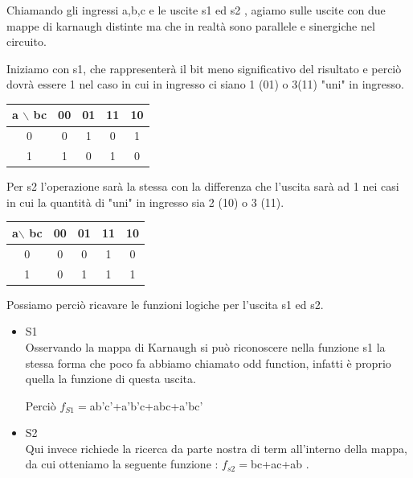 \documentclass[a4paper]{book}
\begin{document}
Chiamando gli ingressi a,b,c e le uscite s1 ed s2 , agiamo sulle uscite con due mappe di karnaugh distinte ma che in realtà sono parallele e sinergiche nel circuito.


Iniziamo con s1, che rappresenterà il bit meno significativo del risultato e perciò dovrà essere 1 nel caso in cui in ingresso ci siano 1 (01) o 3(11) "uni" in ingresso.

\vspace{\baselineskip}
\begin{tabular}{|c|c|c|c|c|}
\hline
a $\backslash$ bc & 00 & 01 & 11 & 10 \\
\hline
0              & 0  & {\cellcolor{yellow} 1 } &  0 & {\cellcolor{yellow}1}  \\
\hline
1             & {\cellcolor{yellow}1}  & 0  &  {\cellcolor{yellow}1} & 0  \\
\hline
\end{tabular}
\newline \vspace{\baselineskip}
Per s2 l'operazione sarà la stessa con la differenza che l'uscita sarà ad 1 nei casi in cui la quantità di "uni" in ingresso sia 2 (10) o 3 (11).
\newline\vspace{\baselineskip}
\begin{tabular}{|c|c|c|c|c|}
\hline
a$\backslash$ bc & 00 & 01 & 11 & 10 \\
\hline
0              & 0  & 0  &  \cellcolor{yellow}1 & 0  \\
\hline
1              & 0  & \cellcolor{yellow}1  &  \cellcolor{yellow}1 & \cellcolor{yellow}1  \\
\hline
\end{tabular}




Possiamo perciò ricavare le funzioni logiche per l'uscita s1 ed s2.

\begin{itemize}
\item{S1} \\ Osservando la mappa di Karnaugh si può riconoscere nella funzione s1 la stessa forma che poco fa abbiamo chiamato odd function, infatti è proprio quella la funzione di questa uscita.

Perciò \(f_{S1}=\)ab'c'+a'b'c+abc+a'bc'

\item{S2} \\ Qui invece richiede la ricerca da parte nostra di term all'interno della mappa, da cui otteniamo la seguente funzione : \(f_{s2}=\)bc+ac+ab .
\end{itemize}
\end{document}
